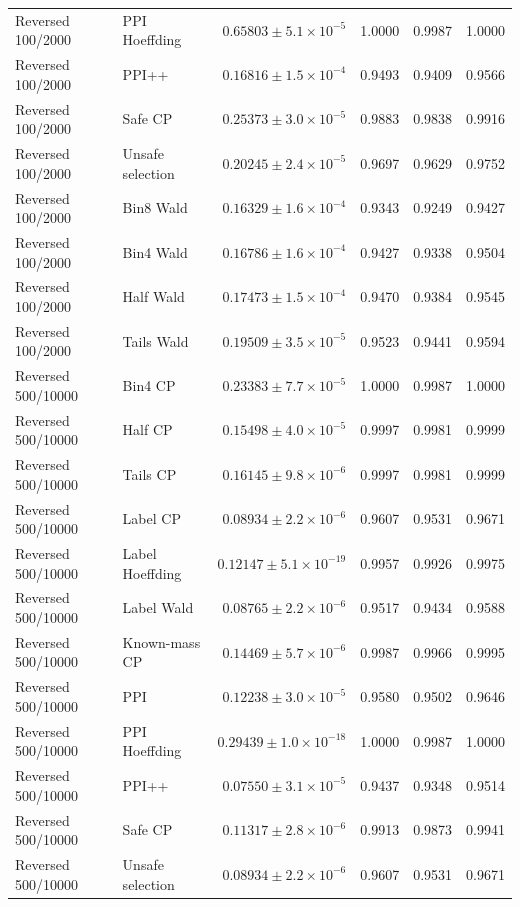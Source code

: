 \begin{longtable}{llrrrr}
Reversed 100/2000 & PPI Hoeffding & $0.65803\pm 5.1\times 10^{-5}$ & 1.0000 & 0.9987 & 1.0000 \\
Reversed 100/2000 & PPI++ & $0.16816\pm 1.5\times 10^{-4}$ & 0.9493 & 0.9409 & 0.9566 \\
Reversed 100/2000 & Safe CP & $0.25373\pm 3.0\times 10^{-5}$ & 0.9883 & 0.9838 & 0.9916 \\
Reversed 100/2000 & Unsafe selection & $0.20245\pm 2.4\times 10^{-5}$ & 0.9697 & 0.9629 & 0.9752 \\
Reversed 100/2000 & Bin8 Wald & $0.16329\pm 1.6\times 10^{-4}$ & 0.9343 & 0.9249 & 0.9427 \\
Reversed 100/2000 & Bin4 Wald & $0.16786\pm 1.6\times 10^{-4}$ & 0.9427 & 0.9338 & 0.9504 \\
Reversed 100/2000 & Half Wald & $0.17473\pm 1.5\times 10^{-4}$ & 0.9470 & 0.9384 & 0.9545 \\
Reversed 100/2000 & Tails Wald & $0.19509\pm 3.5\times 10^{-5}$ & 0.9523 & 0.9441 & 0.9594 \\
Reversed 500/10000 & Bin4 CP & $0.23383\pm 7.7\times 10^{-5}$ & 1.0000 & 0.9987 & 1.0000 \\
Reversed 500/10000 & Half CP & $0.15498\pm 4.0\times 10^{-5}$ & 0.9997 & 0.9981 & 0.9999 \\
Reversed 500/10000 & Tails CP & $0.16145\pm 9.8\times 10^{-6}$ & 0.9997 & 0.9981 & 0.9999 \\
Reversed 500/10000 & Label CP & $0.08934\pm 2.2\times 10^{-6}$ & 0.9607 & 0.9531 & 0.9671 \\
Reversed 500/10000 & Label Hoeffding & $0.12147\pm 5.1\times 10^{-19}$ & 0.9957 & 0.9926 & 0.9975 \\
Reversed 500/10000 & Label Wald & $0.08765\pm 2.2\times 10^{-6}$ & 0.9517 & 0.9434 & 0.9588 \\
Reversed 500/10000 & Known-mass CP & $0.14469\pm 5.7\times 10^{-6}$ & 0.9987 & 0.9966 & 0.9995 \\
Reversed 500/10000 & PPI & $0.12238\pm 3.0\times 10^{-5}$ & 0.9580 & 0.9502 & 0.9646 \\
Reversed 500/10000 & PPI Hoeffding & $0.29439\pm 1.0\times 10^{-18}$ & 1.0000 & 0.9987 & 1.0000 \\
Reversed 500/10000 & PPI++ & $0.07550\pm 3.1\times 10^{-5}$ & 0.9437 & 0.9348 & 0.9514 \\
Reversed 500/10000 & Safe CP & $0.11317\pm 2.8\times 10^{-6}$ & 0.9913 & 0.9873 & 0.9941 \\
Reversed 500/10000 & Unsafe selection & $0.08934\pm 2.2\times 10^{-6}$ & 0.9607 & 0.9531 & 0.9671 \\

\end{longtable}
